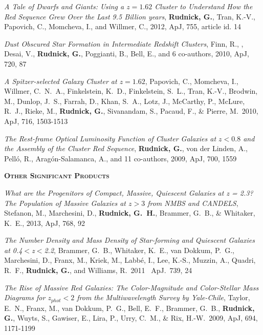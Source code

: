 \documentclass[11pt]{article}
\begin{document}
\hangindent=1.5cm  
{\it A Tale of Dwarfs and Giants: Using a $z=1.62$ Cluster to
  Understand How the Red Sequence Grew Over the Last 9.5 Billion
  years}, {{\bf {Rudnick}, G.}, {Tran}, K.-V., {Papovich}, C.,
  {Momcheva}, I., and {Willmer}, C.}, 2012, ApJ, 755, article id. 14

\hangindent=1.5cm  
{\it Dust Obscured Star Formation in Intermediate Redshift Clusters}, Finn, R., , Desai, V., {\bf
  Rudnick, G.}, Poggianti, B., Bell, E., and 6 co-authors, 2010, ApJ, 720, 87

\hangindent=1.5cm  
{\it A Spitzer-selected Galaxy Cluster at $z = 1.62$}, Papovich, C.,
Momcheva, I., Willmer, C.~N.~A., Finkelstein, K.~D., Finkelstein,
S.~L., Tran, K.-V., Brodwin, M., Dunlop, J.~S., Farrah, D., Khan,
S.~A., Lotz, J., McCarthy, P., McLure, R.~J., Rieke, M., {\bf Rudnick, G.},
Sivanandam, S., Pacaud, F., \& Pierre, M.\ 2010, ApJ, 716, 1503-1513

\hangindent=1.5cm  
{\it The Rest-frame Optical Luminosity Function of Cluster Galaxies at
  $z < 0.8$ and the Assembly of the Cluster Red Sequence}, {\bf Rudnick,
  G.}, {von der Linden}, A., {Pell{\'o}}, R.,
{Arag{\'o}n-Salamanca}, A., and 11 co-authors, 2009, ApJ, 700, 1559

\begin{flushleft}
\vspace{-0.1in}
{\large {\bf \textsc{Other Significant Products}}
\hrulefill}
\end{flushleft}

\vspace{-0.1in}
\hangindent=1.5cm  
{\it What are the Progenitors of Compact, Massive, Quiescent Galaxies
  at z = 2.3? The Population of Massive Galaxies at $z > 3$ from NMBS
  and CANDELS}, Stefanon, M., Marchesini, D., {\bf Rudnick, G.~H.}, Brammer,
G.~B., \& Whitaker, K.~E., 2013, ApJ, 768, 92

\hangindent=1.5cm  {\it The Number Density and Mass
  Density of Star-forming and Quiescent Galaxies at 0.4$<$z$<$2.2},
Brammer, G.~B., Whitaker, K.~E., van Dokkum, P.~G., Marchesini, D.,
Franx, M., Kriek, M., Labb{\'e}, I., Lee, K.-S., Muzzin, A., Quadri,
R.~F., \textbf {Rudnick, G.}, and Williams, R.\ 2011 \ ApJ.\ 739, 24

\hangindent=1.5cm  {\it The Rise of Massive Red Galaxies:
  The Color-Magnitude and Color-Stellar Mass Diagrams for $z_{phot} <
  2$ from the Multiwavelength Survey by Yale-Chile}, Taylor, E.~N.,
Franx, M., van Dokkum, P.~G., Bell, E.~F., Brammer, G.~B., {\bf
  Rudnick, G.}, Wuyts, S., Gawiser, E., Lira, P., Urry, C.~M., \& Rix,
H.-W.\ 2009, ApJ, 694, 1171-1199
\end{document}
